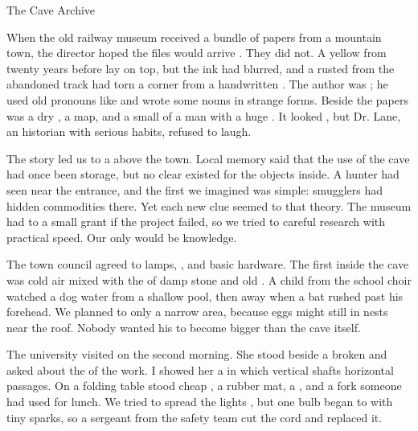 \documentclass[12pt]{nextbook}
\begin{document}
\begin{readersection}{The Cave Archive}

When the old railway museum received a bundle of papers from a mountain town, the director hoped the files would arrive . They did not. A yellow  from twenty years before lay on top, but the ink had blurred, and a rusted  from the abandoned track had torn a corner from a handwritten . The author was ; he used old pronouns like  and wrote some nouns in strange  forms. Beside the papers was a dry , a  map, and a small  of a man with a huge . It looked , but Dr. Lane, an  historian with serious habits, refused to laugh.

The story led us to a  above the town. Local memory said that the  use of the cave had once been storage, but no clear  existed for the objects inside. A hunter had seen  near the entrance, and the first  we imagined was simple: smugglers had hidden commodities there. Yet each new clue seemed to  that theory. The museum had to  a small grant if the project failed, so we tried to  careful research with practical speed. Our only  would be knowledge.

The town council agreed to  lamps, , and basic hardware. The first  inside the cave was cold air mixed with the  of damp stone and old . A child from the school choir watched a dog  water from a shallow pool, then  away when a bat rushed past his forehead. We planned to  only a narrow area, because eggs might still  in nests near the roof. Nobody wanted his  to become bigger than the cave itself.

The university  visited on the second morning. She stood beside a broken  and asked about the  of the work. I showed her a  in which vertical shafts  horizontal passages. On a folding table stood cheap , a rubber mat, a , and a fork someone had used for lunch. We tried to spread the lights , but one bulb began to  with tiny sparks, so a sergeant from the safety team cut the cord and replaced it.


\end{readersection}
\end{document}
